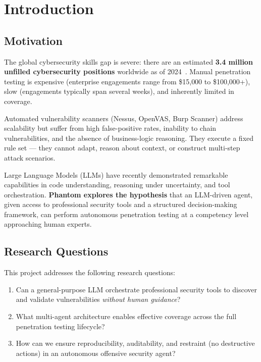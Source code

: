 \documentclass[12pt,a4paper]{article}
\begin{document}
\newpage



\section{Introduction}

\subsection{Motivation}

The global cybersecurity skills gap is severe: there are an estimated \textbf{3.4 million unfilled cybersecurity positions} worldwide as of 2024~\cite{isc2024}. Manual penetration testing is expensive (enterprise engagements range from \$15{,}000 to \$100{,}000+), slow (engagements typically span several weeks), and inherently limited in coverage.

Automated vulnerability scanners (Nessus, OpenVAS, Burp Scanner) address scalability but suffer from high false-positive rates, inability to chain vulnerabilities, and the absence of business-logic reasoning. They execute a fixed rule set — they cannot adapt, reason about context, or construct multi-step attack scenarios.

Large Language Models (LLMs) have recently demonstrated remarkable capabilities in code understanding, reasoning under uncertainty, and tool orchestration. \textbf{Phantom explores the hypothesis} that an LLM-driven agent, given access to professional security tools and a structured decision-making framework, can perform autonomous penetration testing at a competency level approaching human experts.

\subsection{Research Questions}

This project addresses the following research questions:

\begin{enumerate}
  \item Can a general-purpose LLM orchestrate professional security tools to discover and validate vulnerabilities \emph{without human guidance}?
  \item What multi-agent architecture enables effective coverage across the full penetration testing lifecycle?
  \item How can we ensure reproducibility, auditability, and restraint (no destructive actions) in an autonomous offensive security agent?
\end{enumerate}
\end{document}
